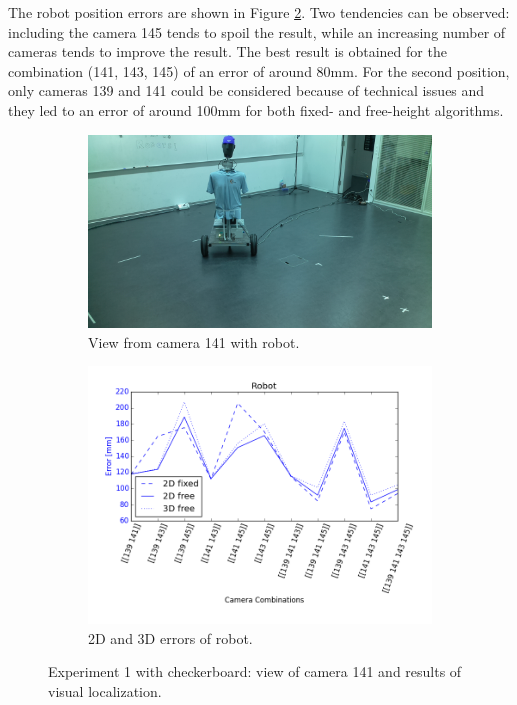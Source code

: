 The robot position errors are shown in Figure \ref{fig:res2_combi}. Two tendencies can be observed:
including the camera 145 tends to spoil the result, while an increasing number of cameras tends to improve the result. The best result is obtained for the combination (141, 143, 145) of an error of around 80mm.
For the second position, only cameras 139 and 141 could be considered because of technical issues and they led to an error of around 100mm for both fixed- and free-height algorithms. 
\begin{figure}
    \centering
    \begin{subfigure}{0.49\linewidth}
        \centering
        \includegraphics[width=\linewidth]{files/res2_0_image_141.png}
        \caption{View from camera 141 with robot.}
        \label{fig:res2_0_image_141}
    \end{subfigure}
    \begin{subfigure}{0.49\linewidth}
        \centering
        \includegraphics[width=\linewidth]{files/res2_combi_rob.png}
        \caption{2D and 3D errors of robot.}
        \label{fig:res2_combi}
    \end{subfigure}
    \caption{Experiment 1 with checkerboard: view of camera 141 and results of visual localization.}
    \label{fig:experiment2_2}
\end{figure}

